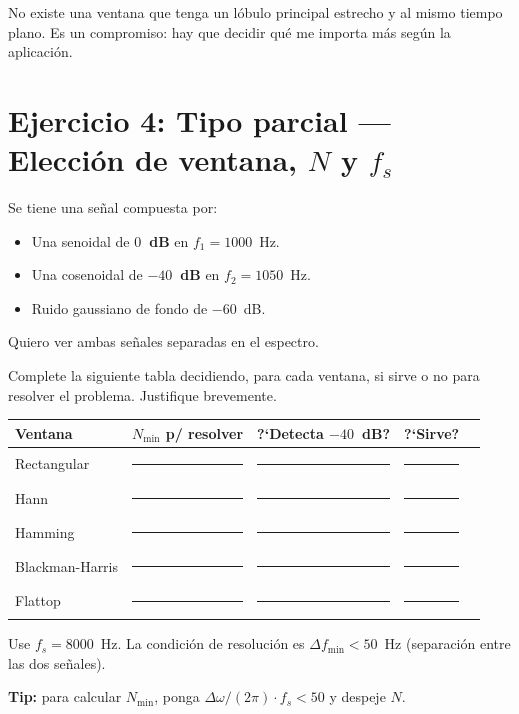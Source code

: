 \documentclass[11pt, a4paper]{article}
\begin{document}
No existe una ventana que tenga un l\'obulo principal estrecho y al mismo
tiempo plano. Es un compromiso: hay que decidir qu\'e me importa m\'as
seg\'un la aplicaci\'on.

\section*{Ejercicio 4: Tipo parcial --- Elecci\'on de ventana, $N$ y $f_s$}

\begin{enun}
Se tiene una se\~nal compuesta por:
\begin{itemize}[noitemsep]
  \item Una senoidal de \textbf{$0$~dB} en $f_1 = 1000$~Hz.
  \item Una cosenoidal de \textbf{$-40$~dB} en $f_2 = 1050$~Hz.
  \item Ruido gaussiano de fondo de $-60$~dB.
\end{itemize}
Quiero ver ambas se\~nales separadas en el espectro.

Complete la siguiente tabla decidiendo, para cada ventana, si sirve o no
para resolver el problema. Justifique brevemente.

\medskip
\begin{center}
\small
\begin{tabular}{lcccc}
\toprule
Ventana & $N_{\min}$ p/ resolver & ?`Detecta $-40$~dB? & ?`Sirve? \\
\midrule
Rectangular     & \rule{2cm}{0.3pt} & \rule{1cm}{0.3pt} & \rule{1.5cm}{0.3pt} \\
Hann            & \rule{2cm}{0.3pt} & \rule{1cm}{0.3pt} & \rule{1.5cm}{0.3pt} \\
Hamming         & \rule{2cm}{0.3pt} & \rule{1cm}{0.3pt} & \rule{1.5cm}{0.3pt} \\
Blackman-Harris & \rule{2cm}{0.3pt} & \rule{1cm}{0.3pt} & \rule{1.5cm}{0.3pt} \\
Flattop         & \rule{2cm}{0.3pt} & \rule{1cm}{0.3pt} & \rule{1.5cm}{0.3pt} \\
\bottomrule
\end{tabular}
\end{center}

Use $f_s = 8000$~Hz. La condici\'on de resoluci\'on es
$\Delta f_{\min} < 50$~Hz (separaci\'on entre las dos se\~nales).

\textbf{Tip:} para calcular $N_{\min}$, ponga
$\Delta\omega / (2\pi) \cdot f_s < 50$ y despeje $N$.
\end{enun}
\end{document}
